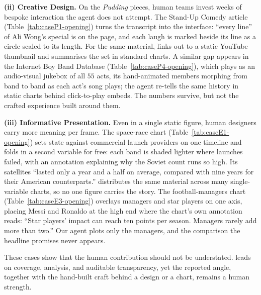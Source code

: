\textbf{(ii) Creative Design.}
On the \textit{Pudding} pieces, human teams invest weeks of bespoke interaction the agent does not attempt. The Stand-Up Comedy article (Table~\ref{tab:caseP1-opening}) turns the transcript into the interface: ``every line'' of Ali Wong's special is on the page, and each laugh is marked beside its line as a circle scaled to its length. For the same material, \methodshort{} links out to a static YouTube thumbnail and summarises the set in standard charts. A similar gap appears in the Internet Boy Band Database (Table~\ref{tab:caseP4-opening}), which plays as an audio-visual jukebox of all $55$ acts, its hand-animated members morphing from band to band as each act's song plays; the agent re-tells the same history in static charts behind click-to-play embeds. The numbers survive, but not the crafted experience built around them.

\textbf{(iii) Informative Presentation.}
Even in a single static figure, human designers carry more meaning per frame. The space-race chart (Table~\ref{tab:caseE1-opening}) sets state against commercial launch providers on one timeline and folds in a second variable for free: each band is shaded lighter where launches failed, with an annotation explaining why the Soviet count runs so high. Its satellites ``lasted only a year and a half on average, compared with nine years for their American counterparts.'' \methodshort{} distributes the same material across many single-variable charts, so no one figure carries the story. The football-managers chart (Table~\ref{tab:caseE3-opening}) overlays managers and star players on one axis, placing Messi and Ronaldo at the high end where the chart's own annotation reads: ``Star players' impact can reach ten points per season. Managers rarely add more than two.'' Our agent plots only the managers, and the comparison the headline promises never appears.

These cases show that the human contribution should not be understated. \methodshort{} leads on coverage, analysis, and auditable transparency, yet the reported angle, together with the hand-built craft behind a design or a chart, remains a human strength.